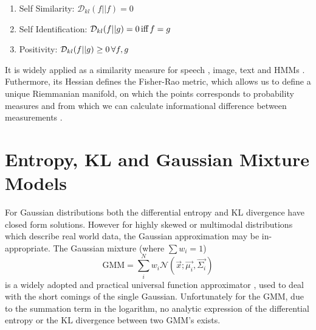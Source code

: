 \documentclass[journal]{IEEEtran}
\begin{document}
\begin{enumerate}
	\item Self Similarity: $\mathcal{D}_{kl}(f||f) = 0$
	\item Self Identification: $\mathcal{D}_{kl}(f||g) = 0\thinspace  \text{iff} \thinspace f=g$
	\item Positivity: $\mathcal{D}_{kl}(f||g) \geq 0 \thinspace \forall f,g$
\end{enumerate}
It is widely applied as a similarity measure for speech \cite{olsen2003efficient}, image, text \cite{huo2006dtw} and HMMs \cite{silva2006average}. Futhermore, its Hessian defines the Fisher-Rao metric, which allows us to define a unique Riemmanian manifold, on which the points corresponds to probability measures and from which we can calculate informational difference between measurements \cite{amari2007methods}.
\section{Entropy, KL and Gaussian Mixture Models}
For Gaussian distributions both the differential entropy and KL divergence have closed form solutions. However for highly skewed or multimodal distributions which describe real world data, the Gaussian approximation may be in-appropriate. The Gaussian mixture (where $\sum w_{i}=1$)
\begin{equation}
\text{GMM} = \sum_{i}^{N}w_{i}\mathcal{N}(\vec{x};\vec{\mu_{i}},\vec{\Sigma_{i}})
\end{equation}  is a widely adopted and practical universal function approximator \cite{maz1996approximate}, used to deal with the short comings of the single Gaussian. Unfortunately for the GMM, due to the summation term in the logarithm, no analytic expression of the differential entropy or the KL divergence between two GMM's exists. 
\end{document}
